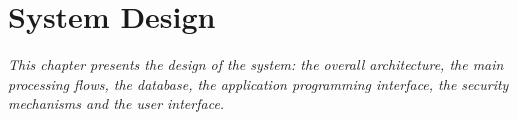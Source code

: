 \chapter{System Design}
\label{chapter:thietke}

\textit{This chapter presents the design of the system: the overall architecture, the main processing flows, the database, the application programming interface, the security mechanisms and the user interface.}







